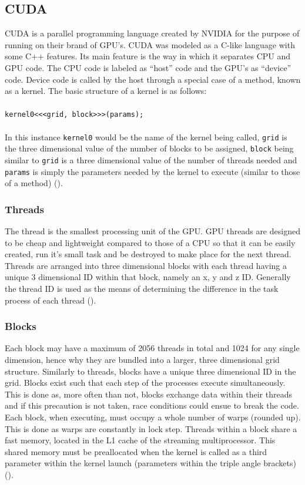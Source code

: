 \subsection{CUDA}\label{gpu:sec:cuda}
CUDA is a parallel programming language created by NVIDIA for the purpose of running on their brand of GPU's. CUDA was modeled as a C-like language with some C++ features. Its main feature is the way in which it separates CPU and GPU code. The CPU code is labeled as ``host'' code and the GPU's as ``device'' code. Device code is called by the host through a special case of a method, known as a kernel. The basic structure of a kernel is as follows: 
\\
\\
\texttt{kernel0<<<grid, block>>>(params);}
\\
\\
In this instance \texttt{kernel0} would be the name of the kernel being called, \texttt{grid} is the three dimensional value of the number of blocks to be assigned, \texttt{block} being similar to \texttt{grid} is a three dimensional value of the number of threads needed and \texttt{params} is simply the parameters needed by the kernel to execute (similar to those of a method) (\cite{CUDA_DEVKIT}).
%
\subsubsection{Threads}\label{gpu:ssec:thread}
The thread is the smallest processing unit of the GPU. GPU threads are designed to be cheap and lightweight compared to those of a CPU so that it can be easily created, run it's small task and be destroyed to make place for the next thread. Threads are arranged into three dimensional blocks with each thread having a unique 3 dimensional ID within that block, namely an x, y and z ID. Generally the thread ID is used as the means of determining the difference in the task process of each thread (\cite{CUDA_DEVKIT}).
%
\subsubsection{Blocks}\label{gpu:ssec:block}
Each block may have a maximum of 2056 threads in total and 1024 for any single dimension, hence why they are bundled into a larger, three dimensional grid structure. Similarly to threads, blocks have a unique three dimensional ID in the grid. Blocks exist such that each step of the processes execute simultaneously. This is done as, more often than not, blocks exchange data within their threads and if this precaution is not taken, race conditions could ensue to break the code. Each block, when executing, must occupy a whole number of warps (rounded up). This is done as warps are constantly in lock step. Threads within a block share a fast memory, located in the L1 cache of the streaming multiprocessor. This shared memory must be preallocated when the kernel is called as a third parameter within the kernel launch (parameters within the triple angle brackets) (\cite{CUDA_DEVKIT}).
%
